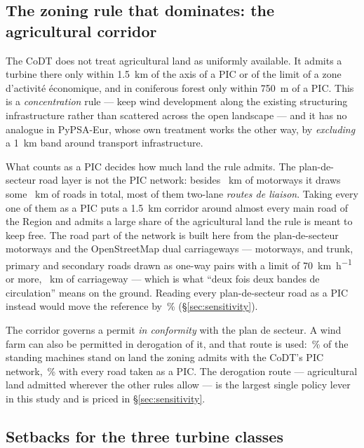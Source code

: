 \documentclass[11pt,a4paper]{article}
\begin{document}
\subsection{The zoning rule that dominates: the agricultural corridor}
\label{sec:corridor}

The CoDT does not treat agricultural land as uniformly available. It admits a
turbine there only within \SI{1.5}{\kilo\metre} of the axis of a PIC or of the
limit of a zone d'activité économique, and in coniferous forest only within
\SI{750}{\metre} of a PIC. This is a \emph{concentration} rule --- keep wind
development along the existing structuring infrastructure rather than scattered
across the open landscape --- and it has no analogue in PyPSA-Eur, whose own
treatment works the other way, by \emph{excluding} a \SI{1}{\kilo\metre} band
around transport infrastructure.

What counts as a PIC decides how much land the rule admits. The plan-de-secteur
road layer is not the PIC network: besides \PicMotorwayKm{}~km of motorways it
draws some \PdsRoadKm{}~km of roads in total, most of them two-lane
\emph{routes de liaison}. Taking every one of them as a PIC puts a
\SI{1.5}{\kilo\metre} corridor around almost every main road of the Region and
admits a large share of the agricultural land the rule is meant to keep free. The road part of the network is built here from
the plan-de-secteur motorways and the OpenStreetMap dual carriageways ---
motorways, and trunk, primary and secondary roads drawn as one-way pairs with a
limit of \SI{70}{\kilo\metre\per\hour} or more, \PicDualKm{}~km of carriageway
--- which is what ``deux fois deux bandes de circulation'' means on the ground.
Reading every plan-de-secteur road as a PIC instead would move the
reference by \SensPicPdsPct{}\,\% (§\ref{sec:sensitivity}).

The corridor governs a permit \emph{in conformity} with the plan de secteur. A
wind farm can also be permitted in derogation of it, and that route is used:
\FleetZoningCodt{}\,\% of the standing machines stand on land the zoning admits
with the CoDT's PIC network, \FleetZoningPsroads{}\,\% with every road taken as
a PIC. The derogation route --- agricultural land admitted wherever the other
rules allow --- is the largest single policy lever in this study and is priced in
§\ref{sec:sensitivity}.

\subsection{Setbacks for the three turbine classes}
\end{document}
